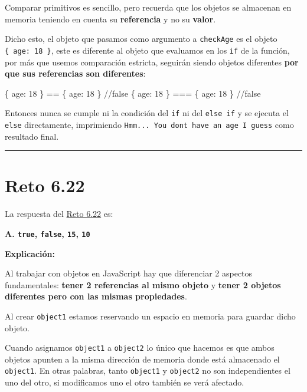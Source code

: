 \documentclass[
  letterpaper,
  DIV=11,
  numbers=noendperiod]{scrreprt}
\newenvironment{Shaded}{\begin{snugshade}}{\end{snugshade}}
\newcommand{\CommentTok}[1]{\textcolor[rgb]{0.37,0.37,0.37}{#1}}
\newcommand{\DataTypeTok}[1]{\textcolor[rgb]{0.68,0.00,0.00}{#1}}
\newcommand{\DecValTok}[1]{\textcolor[rgb]{0.68,0.00,0.00}{#1}}
\newcommand{\NormalTok}[1]{\textcolor[rgb]{0.00,0.23,0.31}{#1}}
\newcommand{\OperatorTok}[1]{\textcolor[rgb]{0.37,0.37,0.37}{#1}}
\begin{document}
Comparar primitivos es sencillo, pero recuerda que los objetos se
almacenan en memoria teniendo en cuenta su \textbf{referencia} y no su
\textbf{valor}.

Dicho esto, el objeto que pasamos como argumento a \texttt{checkAge} es
el objeto \texttt{\{\ age:\ 18\ \}}, este es diferente al objeto que
evaluamos en los \texttt{if} de la función, por más que usemos
comparación estricta, seguirán siendo objetos diferentes \textbf{por que
sus referencias son diferentes}:

\begin{Shaded}
\begin{Highlighting}[]
\NormalTok{\{ }\DataTypeTok{age}\OperatorTok{:} \DecValTok{18}\NormalTok{ \} }\OperatorTok{==}\NormalTok{ \{ }\DataTypeTok{age}\OperatorTok{:} \DecValTok{18}\NormalTok{ \} }\CommentTok{//false}
\NormalTok{\{ }\DataTypeTok{age}\OperatorTok{:} \DecValTok{18}\NormalTok{ \} }\OperatorTok{===}\NormalTok{ \{ }\DataTypeTok{age}\OperatorTok{:} \DecValTok{18}\NormalTok{ \} }\CommentTok{//false}
\end{Highlighting}
\end{Shaded}

Entonces nunca se cumple ni la condición del \texttt{if} ni del
\texttt{else\ if} y se ejecuta el \texttt{else} directamente,
imprimiendo
\texttt{Hmm...\ You\ don\textquotesingle{}t\ have\ an\ age\ I\ guess}
como resultado final.

\begin{center}\rule{0.5\linewidth}{0.5pt}\end{center}

\section{Reto 6.22}\label{sec-sol-cap6-reto22}

La respuesta del \hyperref[sec-cap6-reto22]{Reto 6.22} es:

\textbf{A. \texttt{true}, \texttt{false}, \texttt{15}, \texttt{10}}

\textbf{Explicación:}

Al trabajar con objetos en JavaScript hay que diferenciar 2 aspectos
fundamentales: \textbf{tener 2 referencias al mismo objeto} y
\textbf{tener 2 objetos diferentes pero con las mismas propiedades}.

Al crear \texttt{object1} estamos reservando un espacio en memoria para
guardar dicho objeto.

Cuando asignamos \texttt{object1} a \texttt{object2} lo único que
hacemos es que ambos objetos apunten a la misma dirección de memoria
donde está almacenado el \texttt{object1}. En otras palabras, tanto
\texttt{object1} y \texttt{object2} no son independientes el uno del
otro, si modificamos uno el otro también se verá afectado.
\end{document}
